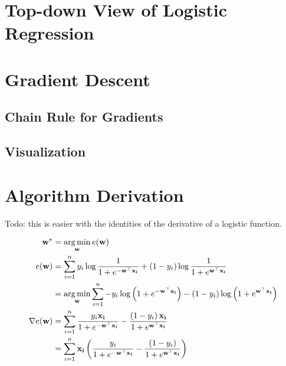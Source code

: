 \documentclass[assignment03_Solutions]{subfiles}
\begin{document}
\section{Top-down View of Logistic Regression}


\section{Gradient Descent}

\subsection{Chain Rule for Gradients}


\subsection{Visualization}

\section{Algorithm Derivation}

Todo: this is easier with the identities of the derivative of a logistic function.

\begin{align}
\mathbf{w^\star} &= \operatorname*{arg\,min}_{\mathbf{w}} e(\mathbf{w}) \\
e(\mathbf{w}) &= \sum_{i=1}^n y_i \log \frac{1}{1 + e^{-\mathbf{w}^\top \mathbf{x_i}}} +  (1-y_i) \log \frac{1}{1 + e^{\mathbf{w}^\top \mathbf{x_i}}} \\
&= \operatorname*{arg\,min}_{\mathbf{w}} \sum_{i=1}^n -y_i \log \left ( 1 + e^{-\mathbf{w}^\top \mathbf{x_i}} \right) -  (1-y_i) \log \left ( 1 + e^{\mathbf{w}^\top \mathbf{x_i}} \right) \\
\nabla e(\mathbf{w}) &= \sum_{i=1}^n \frac{y_i \mathbf{x_i}}{1 + e^{-\mathbf{w}^\top \mathbf{x_i}}} - \frac{\left ( 1 - y_i \right) \mathbf{x_i}}{1 + e^{\mathbf{w}^\top \mathbf{x_i}} } \\
&= \sum_{i=1}^n \mathbf{x_i} \left ( \frac{y_i }{1 + e^{-\mathbf{w}^\top \mathbf{x_i}}} - \frac{\left ( 1 - y_i \right) }{1 + e^{\mathbf{w}^\top \mathbf{x_i}} } \right)
\end{align}
\end{document}
